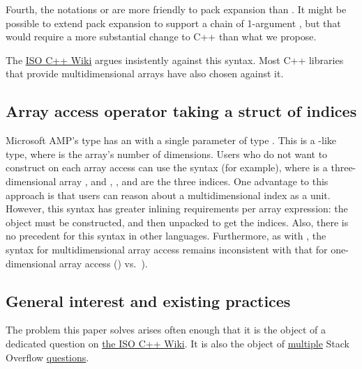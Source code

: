 \documentclass{wg21}
\begin{document}
Fourth, the notations  or  are more friendly to pack expansion than .  It might be possible to extend pack expansion to support a chain of 1-argument , but that would require a more substantial change to C++ than what we propose.

The \href{https://isocpp.org/wiki/faq/operator-overloading#matrix-array-of-array}{ISO C++ Wiki} argues insistently against this syntax.  Most C++ libraries that provide multidimensional arrays have also chosen against it.

\subsection{Array access operator taking a struct of indices}

Microsoft AMP's  type has an  with a single parameter of type .  This is a -like type, where  is the array's number of dimensions.  Users who do not want to construct  on each array access can use the syntax  (for example), where  is a three-dimensional array , and , , and  are the three indices.  One advantage to this approach is that users can reason about a multidimensional index as a unit.  However, this syntax has greater inlining requirements per array expression: the  object must be constructed, and then unpacked to get the indices.  Also, there is no precedent for this  syntax in other languages. Furthermore, as with , the syntax for multidimensional array access remains inconsistent with that for one-dimensional array access () vs.\ ).

\subsection{General interest and existing practices}

The problem this paper solves arises often enough that it is the object of a dedicated question on \href{https://isocpp.org/wiki/faq/operator-overloading#matrix-subscript-op}{the ISO C++ Wiki}.  It is also the object of \href{https://stackoverflow.com/questions/7032743/can-cs-operator-take-more-than-one-argument}{multiple} Stack Overflow \href{https://stackoverflow.com/questions/1936399/c-array-operator-with-multiple-arguments/1936410}{questions}.
\end{document}
